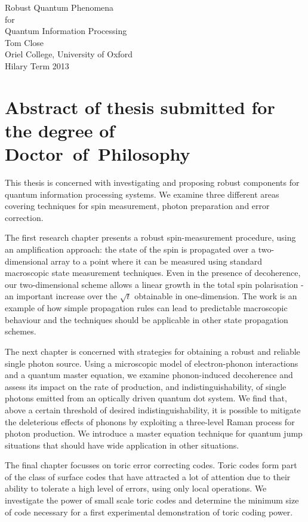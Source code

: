 \enlargethispage{2cm}
\begin{center}

  {\Huge Robust Quantum Phenomena \\[0.0cm] 
               for \\[0.3cm] 
               Quantum Information Processing}\\[1cm]

  {\large Tom Close\\
               Oriel College, University of Oxford\\
               Hilary Term 2013\\[1cm]
  }

\end{center}
 
\section*{Abstract of thesis submitted for the degree of \mbox{Doctor of Philosophy}} 

This thesis is concerned with investigating and proposing robust components for quantum information processing systems. We examine three different areas covering techniques for spin measurement, photon preparation and error correction.

The first research chapter presents a robust spin-measurement procedure, using an amplification approach: the state of the spin is propagated over a two-dimensional array to a point where it can be measured using standard macroscopic state measurement techniques. Even in the presence of decoherence, our two-dimensional scheme allows a linear growth in the total spin polarisation - an important increase over the $\sqrt{t}$ obtainable in one-dimension. The work is an example of how simple propagation rules can lead to predictable macroscopic behaviour and the techniques should be applicable in other state propagation schemes. 

The next chapter is concerned with strategies for obtaining a robust and reliable single photon source. Using a microscopic model of electron-phonon interactions and a quantum master equation, we examine phonon-induced decoherence and assess its impact on the rate of production, and indistinguishability, of single photons emitted from an optically driven quantum dot system. We find that, above a certain threshold of desired indistinguishability, it is possible to mitigate the deleterious effects of phonons by exploiting a three-level Raman process for photon production. We introduce a master equation technique for quantum jump situations that should have wide application in other situations.

The final chapter focusses on toric error correcting codes. Toric codes form part of the class of surface codes that have attracted a lot of attention due to their ability to tolerate a high level of errors, using only local operations. We investigate the power of small scale toric codes and determine the minimum size of code necessary for a first experimental demonstration of toric coding power.


